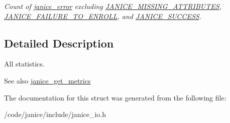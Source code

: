 \begin{DoxyCompactItemize}
\begin{DoxyCompactList}\small\item\em Count of \hyperlink{group__janice_gac9071fe2c752efef60aa3f932a290fda}{janice\+\_\+error} excluding \hyperlink{group__janice_gga4873d49c1f9d6a6880dfbd485cf6ba72a3769c1a562e8b70e94b183cfeabc2d66}{J\+A\+N\+I\+C\+E\+\_\+\+M\+I\+S\+S\+I\+N\+G\+\_\+\+A\+T\+T\+R\+I\+B\+U\+T\+E\+S}, \hyperlink{group__janice_gga4873d49c1f9d6a6880dfbd485cf6ba72ad318d25055b2f4457f326c7243f87983}{J\+A\+N\+I\+C\+E\+\_\+\+F\+A\+I\+L\+U\+R\+E\+\_\+\+T\+O\+\_\+\+E\+N\+R\+O\+L\+L}, and \hyperlink{group__janice_gga4873d49c1f9d6a6880dfbd485cf6ba72a7cd6c7d28583c2dfa4e19f8642a60f3e}{J\+A\+N\+I\+C\+E\+\_\+\+S\+U\+C\+C\+E\+S\+S}. \end{DoxyCompactList}\end{DoxyCompactItemize}


\subsection{Detailed Description}
All statistics. 

\begin{DoxySeeAlso}{See also}
\hyperlink{group__janice__io_gaa6aa5fa8550b3066a0dad696d6368762}{janice\+\_\+get\+\_\+metrics} 
\end{DoxySeeAlso}


The documentation for this struct was generated from the following file\+:\begin{DoxyCompactItemize}
\item 
/code/janice/include/janice\+\_\+io.\+h\end{DoxyCompactItemize}
